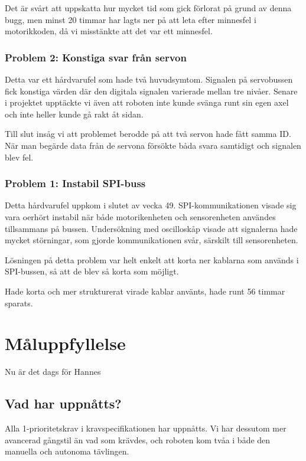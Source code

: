 \documentclass[a4paper,titlepage,12pt]{article}
\begin{document}
    Det är svårt att uppskatta hur mycket tid som gick förlorat på grund av
    denna bugg, men minst 20 timmar har lagts ner på att leta efter minnesfel i
    motorikkoden, då vi misstänkte att det var ett minnesfel.

    \subsubsection{Problem 2: Konstiga svar från servon}

    Detta var ett hårdvarufel som hade två huvudsymtom. Signalen på servobussen fick 
	konstiga värden där den digitala signalen varierade mellan tre nivåer. Senare i 
	projektet upptäckte vi även att roboten inte kunde svänga runt sin egen axel och
	inte heller kunde gå rakt åt sidan. 
	
	Till slut insåg vi att problemet berodde på att två servon hade fått samma ID. 
	När man begärde data från de servona försökte båda svara samtidigt och signalen
	blev fel.

    \subsubsection{Problem 1: Instabil SPI-buss}

    Detta hårdvarufel uppkom i slutet av vecka 49. SPI-kommunikationen visade
    sig vara oerhört instabil när både motorikenheten och sensorenheten
    användes tillsammans på bussen. Undersökning med oscilloskåp visade att
    signalerna hade mycket störningar, som gjorde kommunikationen svår,
    särskilt till sensorenheten.

    Lösningen på detta problem var helt enkelt att korta ner kablarna som
    används i SPI-bussen, så att de blev så korta som möjligt.

    Hade korta och mer strukturerat virade kablar använts, hade runt 56 timmar
    sparats. %

	\section{Måluppfyllelse}
	Nu är det dags för Hannes
	
	\subsection{Vad har uppnåtts?}
    Alla 1-prioritetskrav i kravspecifikationen har uppnåtts. Vi har dessutom
    mer avancerad gångstil än vad som krävdes, och roboten kom tvåa i både den
    manuella och autonoma tävlingen.
	
\end{document}
